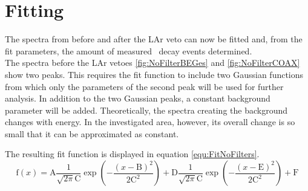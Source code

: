 \documentclass[encoding=utf8,british]{tumphthesis}
\begin{document}

\section{Fitting}
\label{sec:Fitting}

The spectra from before and after the LAr veto can now be fitted and, from the fit parameters, the amount of measured \Kr\ decay events determined.
\\

The spectra before the LAr vetoes \ref{fig:NoFilterBEGes} and \ref{fig:NoFilterCOAX} show two peaks.
This requires the fit function to include two Gaussian functions from which only the parameters of the second peak will be used for further analysis.
In addition to the two Gaussian peaks, a constant background parameter will be added.
Theoretically, the  spectra creating the background changes with energy.
In the investigated area, however, its overall change is so small that it can be approximated as constant. 

The resulting fit function is displayed in equation \ref{equ:FitNoFilters}.
\\

\begin{equation}
\mathrm{f}(x) = \mathrm{A}\frac{1}{\sqrt{2\pi}\mathrm{C}}\exp\left(-\frac{(x-\mathrm{B})^2}{2\mathrm{C}^2}\right) + \mathrm{D}\frac{1}{\sqrt{2\pi}\mathrm{C}}\exp\left(-\frac{(x-\mathrm{E})^2}{2\mathrm{C}^2}\right) + \mathrm{F}
\label{equ:FitNoFilters}
\end{equation}
\\
\end{document}
